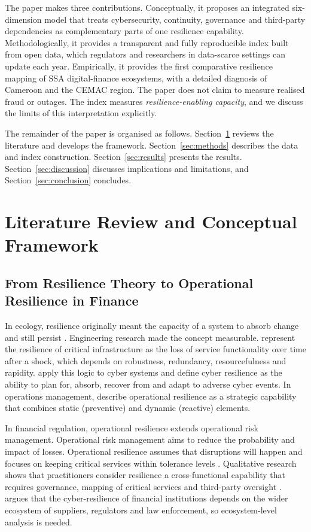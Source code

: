 \documentclass[fintech,article,submit,pdftex,moreauthors]{Definitions/mdpi}
\begin{document}
The paper makes three contributions. Conceptually, it proposes an integrated six-dimension model that treats cybersecurity, continuity, governance and third-party dependencies as complementary parts of one resilience capability. Methodologically, it provides a transparent and fully reproducible index built from open data, which regulators and researchers in data-scarce settings can update each year. Empirically, it provides the first comparative resilience mapping of SSA digital-finance ecosystems, with a detailed diagnosis of Cameroon and the CEMAC region. The paper does not claim to measure realised fraud or outages. The index measures \emph{resilience-enabling capacity}, and we discuss the limits of this interpretation explicitly.

The remainder of the paper is organised as follows. Section~\ref{sec:background} reviews the literature and develops the framework. Section~\ref{sec:methods} describes the data and index construction. Section~\ref{sec:results} presents the results. Section~\ref{sec:discussion} discusses implications and limitations, and Section~\ref{sec:conclusion} concludes.

\section{Literature Review and Conceptual Framework}\label{sec:background}

\subsection{From Resilience Theory to Operational Resilience in Finance}

In ecology, resilience originally meant the capacity of a system to absorb change and still persist \citep{Holling1973}. Engineering research made the concept measurable. \citet{Bruneau2003} represent the resilience of critical infrastructure as the loss of service functionality over time after a shock, which depends on robustness, redundancy, resourcefulness and rapidity. \citet{Linkov2018} apply this logic to cyber systems and define cyber resilience as the ability to plan for, absorb, recover from and adapt to adverse cyber events. In operations management, \citet{Annarelli2016} describe operational resilience as a strategic capability that combines static (preventive) and dynamic (reactive) elements.

In financial regulation, operational resilience extends operational risk management. Operational risk management aims to reduce the probability and impact of losses. Operational resilience assumes that disruptions will happen and focuses on keeping critical services within tolerance levels \citep{BCBS2021,Milkau2021}. Qualitative research shows that practitioners consider resilience a cross-functional capability that requires governance, mapping of critical services and third-party oversight \citep{Iyer2024}. \citet{Dupont2019} argues that the cyber-resilience of financial institutions depends on the wider ecosystem of suppliers, regulators and law enforcement, so ecosystem-level analysis is needed.
\end{document}
